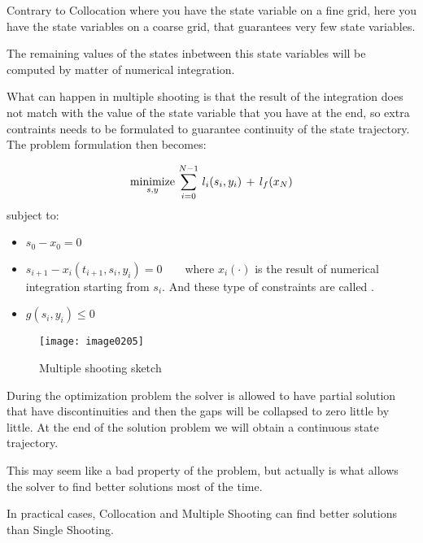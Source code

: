 Contrary to Collocation where you have the state variable on a fine grid, here you have the state variables on a coarse grid, that guarantees very few state variables.

The remaining values of the states inbetween this state variables will be computed by matter of numerical integration.

What can happen in multiple shooting is that the result of the integration does not match with the value of the state variable that you have at the end, so extra contraints needs to be formulated to guarantee continuity of the state trajectory. The problem formulation then becomes:

\[\operatorname*{minimize}_{s, y} \,\sum_{i=0}^{N-1}\,l_i(s_i, y_i)\,+\,l_f(x_N)\]
subject to:
\begin{itemize}
\item $s_0 - x_0 = 0$
\item $s_{i+1} - x_i(t_{i+1}, s_i, y_i) = 0\qquad$where $x_i(\cdot)$ is the result of numerical integration starting from $s_i$. And these type of constraints are called .
\item $g(s_i, y_i) \le 0$
\end{itemize}

\begin{figure}[!h]
\centering
\texttt{[image: image0205]}
\caption{Multiple shooting sketch}
\end{figure}

During the optimization problem the solver is allowed to have partial solution that have discontinuities and then the gaps will be collapsed to zero little by little. At the end of the solution problem we will obtain a continuous state trajectory.

This may seem like a bad property of the problem, but actually is what allows the solver to find better solutions most of the time.

In practical cases, Collocation and Multiple Shooting can find better solutions than Single Shooting.

 
